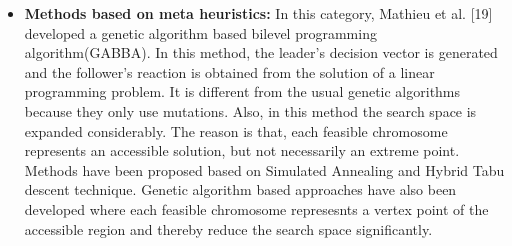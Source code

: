 \documentclass[a4paper, 12pt]{article}
\begin{document}
\begin{itemize}
\item \textbf{Methods based on meta heuristics:} In this category, Mathieu et al. [19] developed a genetic algorithm based bilevel programming algorithm(GABBA). In this method, the leader's decision vector is generated and the follower's reaction is obtained from the solution of a linear programming problem. It is different from the usual genetic algorithms because they only use mutations. Also, in this method the search space is expanded considerably. The reason is that, each feasible chromosome represents an accessible solution, but not necessarily an extreme point. Methods have been proposed based on Simulated Annealing and Hybrid Tabu descent technique. Genetic algorithm based approaches have also been developed where each feasible chromosome represesnts a vertex point of the accessible region and thereby reduce the search space significantly.
\end{itemize}

\end{document}
